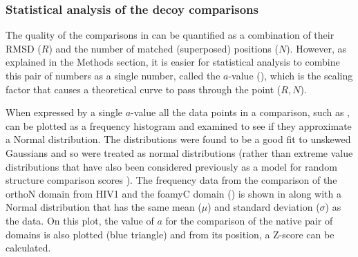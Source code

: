 %
%
%
%
%
%
%
%
%

\subsubsection{Statistical analysis of the decoy comparisons}

The quality of the comparisons in  can be quantified as a combination of their
RMSD ($R$) and the number of matched (superposed) positions ($N$).   However, as explained in 
the Methods section, it is easier for statistical analysis to combine this pair of numbers
as a single number,  called the $a$-value (), which is the scaling factor that
causes a theoretical curve to pass through the point ($R,N$).

When expressed by a single $a$-value
all the data points in a comparison, such as ,
can be plotted as a frequency histogram and examined to see if they approximate a Normal
distribution.   The distributions were found to be a good fit to unskewed Gaussians and
so were treated as normal distributions (rather than extreme value distributions
that have also been considered previously as a model for random structure comparison scores
\cite{Levitt,Taylor}).    The frequency data from the comparison of the orthoN domain from
HIV1 and the foamyC domain () is shown in  along with a Normal  
distribution that has the same mean ($\mu$) and standard deviation ($\sigma$) as the data.
On this plot, the value of $a$ for the comparison of the
native pair of domains is also plotted (blue triangle) and from its position, a Z-score
can be calculated.


